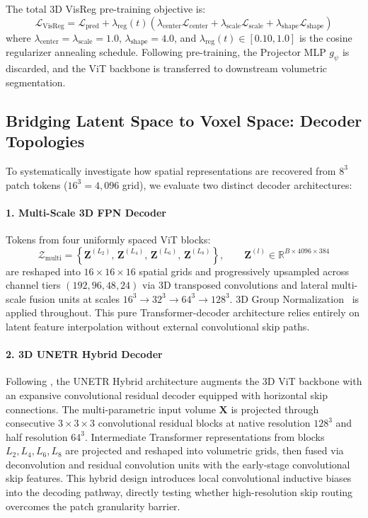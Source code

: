 \documentclass{article}
\begin{document}
The total 3D VisReg pre-training objective is:
\begin{equation}
    \mathcal{L}_{\text{VisReg}} = \mathcal{L}_{\text{pred}} + \lambda_{\text{reg}}(t)\left(\lambda_{\text{center}} \mathcal{L}_{\text{center}} + \lambda_{\text{scale}} \mathcal{L}_{\text{scale}} + \lambda_{\text{shape}} \mathcal{L}_{\text{shape}}\right)
\end{equation}
where $\lambda_{\text{center}} = \lambda_{\text{scale}} = 1.0$, $\lambda_{\text{shape}} = 4.0$, and $\lambda_{\text{reg}}(t) \in [0.10, 1.0]$ is the cosine regularizer annealing schedule. Following pre-training, the Projector MLP $g_\psi$ is discarded, and the ViT backbone is transferred to downstream volumetric segmentation.

\subsection{Bridging Latent Space to Voxel Space: Decoder Topologies}
\label{sec:decoder}

To systematically investigate how spatial representations are recovered from $8^3$ patch tokens ($16^3 = 4,096$ grid), we evaluate two distinct decoder architectures:

\paragraph{1. Multi-Scale 3D FPN Decoder}
Tokens from four uniformly spaced ViT blocks:
\begin{equation}
    \mathcal{Z}_{\text{multi}} = \left\{ \mathbf{Z}^{(L_2)}, \, \mathbf{Z}^{(L_4)}, \, \mathbf{Z}^{(L_6)}, \, \mathbf{Z}^{(L_8)} \right\}, \qquad \mathbf{Z}^{(l)} \in \mathbb{R}^{B \times 4096 \times 384}
\end{equation}
are reshaped into $16 \times 16 \times 16$ spatial grids and progressively upsampled across channel tiers $(192, 96, 48, 24)$ via 3D transposed convolutions and lateral multi-scale fusion units at scales $16^3 \to 32^3 \to 64^3 \to 128^3$. 3D Group Normalization~\citep{wu2018group} is applied throughout. This pure Transformer-decoder architecture relies entirely on latent feature interpolation without external convolutional skip paths.

\paragraph{2. 3D UNETR Hybrid Decoder}
Following \citet{hatamizadeh2022unetr}, the UNETR Hybrid architecture augments the 3D ViT backbone with an expansive convolutional residual decoder equipped with horizontal skip connections. The multi-parametric input volume $\mathbf{X}$ is projected through consecutive $3 \times 3 \times 3$ convolutional residual blocks at native resolution $128^3$ and half resolution $64^3$. Intermediate Transformer representations from blocks $L_2, L_4, L_6, L_8$ are projected and reshaped into volumetric grids, then fused via deconvolution and residual convolution units with the early-stage convolutional skip features. This hybrid design introduces local convolutional inductive biases into the decoding pathway, directly testing whether high-resolution skip routing overcomes the patch granularity barrier.
\end{document}
